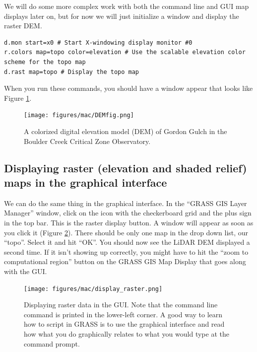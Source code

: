 \documentclass{book}
\begin{document}
We will do some more complex work with both the command line and GUI map displays later on, but for now we will just initialize a window and display the raster DEM.
\begin{lstlisting}
d.mon start=x0 # Start X-windowing display monitor #0
r.colors map=topo color=elevation # Use the scalable elevation color scheme for the topo map
d.rast map=topo # Display the topo map
\end{lstlisting}
When you run these commands, you should have a window appear that looks like Figure \ref{fig:DEMfig}.

\begin{figure}[h]
 \begin{center}
 \texttt{[image: figures/mac/DEMfig.png]}
 \caption{A colorized digital elevation model (DEM) of Gordon Gulch in the Boulder Creek Critical Zone Observatory.}
 \label{fig:DEMfig}
 \end{center}
\end{figure}

\subsection{Displaying raster (elevation and shaded relief) maps in the graphical interface}

We can do the same thing in the graphical interface. In the ``GRASS GIS Layer Manager'' window, click on the icon with the checkerboard grid and the plus sign in the top bar. This is the raster display button. A window will appear as soon as you click it (Figure \ref{fig:display_raster}). There should be only one map in the drop down list, our ``topo''. Select it and hit ``OK''. You should now see the LiDAR DEM displayed a second time. If it isn't showing up correctly, you might have to hit the ``zoom to computational region'' button on the GRASS GIS Map Display that goes along with the GUI.

\begin{figure}
 \begin{center}
 \texttt{[image: figures/mac/display\_raster.png]}
 \caption{Displaying raster data in the GUI. Note that the command line command is printed in the lower-left corner. A good way to learn how to script in GRASS is to use the graphical interface and read how what you do graphically relates to what you would type at the command prompt.}
 \label{fig:display_raster}
 \end{center}
\end{figure}
\end{document}
